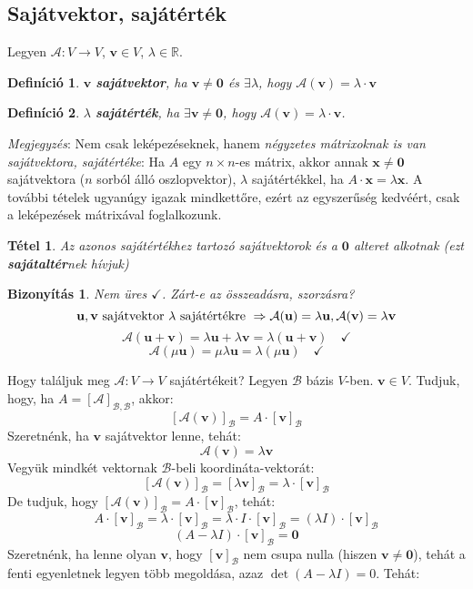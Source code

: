 \documentclass[a4paper,12pt,twoside]{book}
\newcommand{\vek}[1]{\mathbf{#1}} %
\newcommand{\R}{\mathbb{R}}
\newtheorem{defi}{Definíció}[chapter]
\newtheorem{tetel}{Tétel}[chapter]
\newtheorem{biz}{Bizonyítás}[chapter]
\theoremstyle{break}
\begin{document}
\subsection{Sajátvektor, sajátérték}

Legyen $\mathcal{A}: V\to V$, $\vek{v} \in V$, $\lambda\in\R$.

\begin{defi}
$\vek{v}$ \textbf{sajátvektor}, ha $\vek{v} \neq \vek{0}$ és $\exists \lambda$, hogy $\mathcal{A}(\vek{v}) = \lambda\cdot \vek{v}$
\end{defi}

\begin{defi} 
$\lambda$ \textbf{sajátérték}, ha $\exists \vek{v}\neq \vek{0}$, hogy $\mathcal{A}(\vek{v})=\lambda\cdot \vek{v}$.
\end{defi}

\emph{Megjegyzés}: Nem csak leképezéseknek, hanem \emph{négyzetes mátrixoknak is van sajátvektora, saját\-értéke}: Ha $A$ egy $n\times n$-es mátrix, akkor annak $\vek{x}\neq\vek{0}$ sajátvektora ($n$ sorból álló oszlopvektor), $\lambda$ sajátértékkel, ha $A\cdot \vek{x} = \lambda\vek{x}$. A további tételek ugyanúgy igazak mindkettőre, ezért az egyszerűség kedvéért, csak a leképezések mátrixával foglalkozunk.

\begin{tetel}
 Az azonos sajátértékhez tartozó sajátvektorok és a $\vek{0}$ alteret alkotnak (ezt \textbf{sajátal\-tér}nek hívjuk)
\end{tetel}
\begin{biz}
 Nem üres $\checkmark$. Zárt-e az összeadásra, szorzásra?
 \[\vek{u}, \vek{v} \hbox{ sajátvektor $\lambda$ sajátértékre } \Rightarrow \mathcal{A}(\vek{u})=\lambda\vek{u}, \mathcal{A}(\vek{v})=\lambda\vek{v}\]
 \[\mathcal{A}(\vek{u}+\vek{v}) = \lambda\vek{u}+\lambda\vek{v} = \lambda(\vek{u}+\vek{v}) \quad \checkmark\]
 \[\mathcal{A}(\mu\vek{u}) =  \mu\lambda\vek{u} = \lambda(\mu\vek{u}) \quad \checkmark\]
\end{biz}

Hogy találjuk meg $\mathcal{A}: V\to V$ sajátértékeit? Legyen $\mathcal{B}$ bázis $V$-ben. $\vek{v}\in V$. Tudjuk, hogy, ha $A = [\mathcal{A}]_{\mathcal{B},\mathcal{B}}$, akkor:
\[[\mathcal{A}(\vek{v})]_\mathcal{B} = A\cdot [\vek{v}]_{\mathcal{B}}\]
Szeretnénk, ha $\vek{v}$ sajátvektor lenne, tehát:
\[\mathcal{A}(\vek{v}) = \lambda\vek{v}\]
Vegyük mindkét vektornak $\mathcal{B}$-beli koordináta-vektorát:
\[[\mathcal{A}(\vek{v})]_\mathcal{B} = [\lambda\vek{v}]_{\mathcal{B}} = \lambda\cdot[\vek{v}]_{\mathcal{B}}\]
De tudjuk, hogy $[\mathcal{A}(\vek{v})]_\mathcal{B} = A\cdot [\vek{v}]_{\mathcal{B}}$, tehát:
\[A\cdot [\vek{v}]_{\mathcal{B}} = \lambda \cdot [\vek{v}]_{\mathcal{B}} = \lambda\cdot I\cdot [\vek{v}]_{\mathcal{B}} = (\lambda I)\cdot [\vek{v}]_{\mathcal{B}}\]
\[(A-\lambda I)\cdot [\vek{v}]_{\mathcal{B}} = \vek{0}\]
Szeretnénk, ha lenne olyan $\vek{v}$, hogy $[\vek{v}]_{\mathcal{B}}$ nem csupa nulla (hiszen $\vek{v}\neq\vek{0}$), tehát a fenti egyenletnek legyen több megoldása, azaz $\det(A-\lambda I) = 0$. Tehát:
\end{document}
